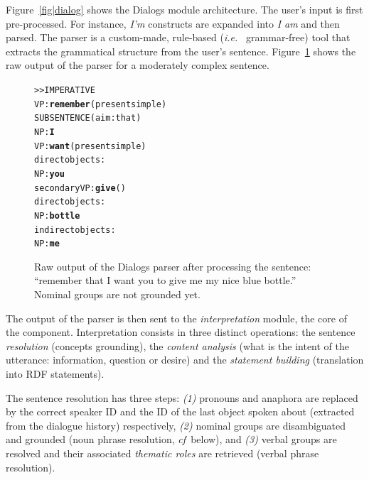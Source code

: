 \documentclass[twocolumn]{svjour3}
\newcommand{\ie}{{\textit{i.e.~}}}
\newcommand{\cf}{{\textit{cf~}}}
\begin{document}
Figure~\ref{fig|dialog} shows the {\sc Dialogs} module architecture. The user's
input is first pre-processed. For instance, \emph{I'm} constructs are expanded
into \emph{I am} and then parsed. The parser is a custom-made, rule-based (\ie
grammar-free) tool that extracts the grammatical structure from the user's
sentence. Figure~\ref{dialog|parser_output} shows the raw output of the parser for a
moderately complex sentence.

\begin{figure}[!ht]
\begin{center}
\scriptsize
\begin{alltt}
>> IMPERATIVE
VP: \textbf{remember} (present simple)
    SUBSENTENCE (aim: that)
      NP: \textbf{I}
      VP: \textbf{want} (present simple)
        direct objects: 
          NP: \textbf{you}
        secondary VP: \textbf{give} ()
              direct objects:
                NP: \textbf{bottle}
              indirect objects:
                NP: \textbf{me}
\end{alltt}
\end{center}
\caption{Raw output of the {\sc Dialogs} parser after processing the
sentence: ``remember that I want you to give me my nice blue bottle.'' 
Nominal groups are not grounded yet.} 
\label{dialog|parser_output}
\end{figure}

The output of the parser is then sent to the \emph{interpretation} module, the
core of the component.  Interpretation consists in three distinct operations:
the sentence \emph{resolution} (concepts grounding), the \emph{content
analysis} (what is the intent of the utterance: information, question or
desire) and the \emph{statement building} (translation into RDF statements).

The sentence resolution has three steps: {\it(1)} pronouns and anaphora are
replaced by the correct speaker ID and the ID of the last object spoken about
(extracted from the dialogue history) respectively, {\it(2)} nominal groups are
disambiguated and grounded (noun phrase resolution, \cf below), and {\it(3)}
verbal groups are resolved and their associated \emph{thematic roles} are
retrieved (verbal phrase resolution).
\end{document}

